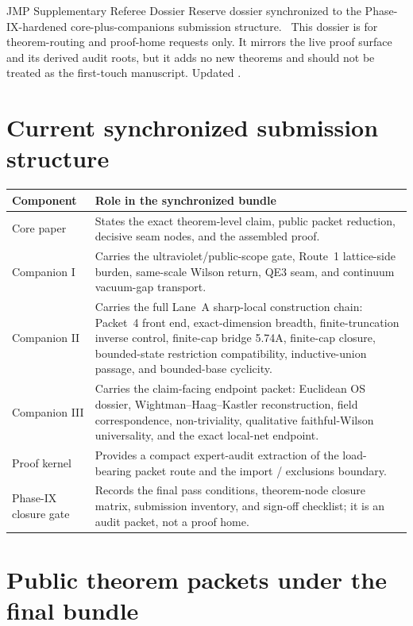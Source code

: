 \documentclass[11pt]{article}
\begin{document}
\SupportTitleBlock
  {JMP Supplementary Referee Dossier}
  {Reserve dossier synchronized to the Phase-IX-hardened core-plus-companions submission structure.}
  {\ReserveOnlyNote\ This dossier is for theorem-routing and proof-home requests only. It mirrors the live proof surface and its derived audit roots, but it adds no new theorems and should not be treated as the first-touch manuscript. Updated \SyncDate.}

\section{Current synchronized submission structure}

\begin{center}
\small
\begin{tabularx}{\linewidth}{@{}L{2.2cm}Y@{}}
\toprule
\textbf{Component} & \textbf{Role in the synchronized bundle}\\
\midrule
Core paper & States the exact theorem-level claim, public packet reduction, decisive seam nodes, and the assembled proof.\\
Companion I & Carries the ultraviolet/public-scope gate, Route~1 lattice-side burden, same-scale Wilson return, QE3 seam, and continuum vacuum-gap transport.\\
Companion II & Carries the full Lane~A sharp-local construction chain: Packet~4 front end, exact-dimension breadth, finite-truncation inverse control, finite-cap bridge 5.74A, finite-cap closure, bounded-state restriction compatibility, inductive-union passage, and bounded-base cyclicity.\\
Companion III & Carries the claim-facing endpoint packet: Euclidean OS dossier, Wightman--Haag--Kastler reconstruction, field correspondence, non-triviality, qualitative faithful-Wilson universality, and the exact local-net endpoint.\\
Proof kernel & Provides a compact expert-audit extraction of the load-bearing packet route and the import / exclusions boundary.\\
Phase-IX closure gate & Records the final pass conditions, theorem-node closure matrix, submission inventory, and sign-off checklist; it is an audit packet, not a proof home.\\
\bottomrule
\end{tabularx}
\end{center}

\section{Public theorem packets under the final bundle}
\end{document}
